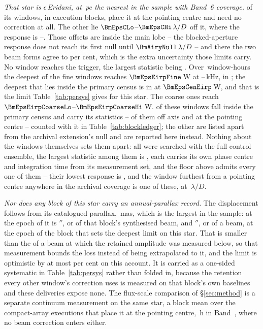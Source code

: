 \emph{That star is $\epsilon$\,Eridani, at \BmEpsDistPc\,pc the nearest in the
sample with Band~6 coverage.} \BmEpsNOn{} of its \BmEpsNWin{} windows, in
\BmEpsNBlock{} execution blocks, place it at the pointing centre and need no
correction at all. The other \BmEpsNOff{} lie
$\BmEpsCLo$--$\BmEpsCHi\,\lambda/D$ off it, where the response is
\BmEpsRespLo--\BmEpsRespHi. Those offsets are inside the main lobe -- the
blocked-aperture response does not reach its first null until
$\BmAiryNull\,\lambda/D$ -- and there the two beam forms agree to
\BmEpsAgreePct{} per cent, which is the extra uncertainty those limits carry.
No window reaches the trigger, the largest statistic being \BmEpsTMax. Over
\BmEpsHours\,window-hours the deepest of the \BmEpsNFine{} fine windows
reaches $\BmEpsEirpFine$\,W at
\BmEpsChanFineKHzLo--\BmEpsChanFineKHzHi\,kHz, in \BmEpsExtEb; the deepest
that lies inside the primary census is in \BmEpsCenEb{} at
$\BmEpsCenEirp$\,W, and that is the limit Table~\ref{tab:persys} gives for
this star. The
\BmEpsNCoarse{} coarse ones reach
$\BmEpsEirpCoarseLo$--$\BmEpsEirpCoarseHi$\,W. \BmEpsNCensus{} of these
windows fall inside the primary census and carry its statistics --
\BmEpsNCensusOff{} of them off axis and \BmEpsNCensusOn{} at the pointing
centre -- counted with it in Table~\ref{tab:blockledger}; the other
\BmEpsNExt{} are listed apart from the archival extension's null and are
reported here instead. Nothing about the windows themselves sets them apart:
all \ExNSearched{} were searched with the full control ensemble, the largest
statistic among them is \ExTMax, each carries its own phase centre and
integration time from its measurement set, and the floor above admits every
one of them -- their lowest response is \ExRespMin, and the window furthest
from a pointing centre anywhere in the archival coverage is one of these, at
\ExCWorstExt\,$\lambda/D$.

\emph{Nor does any block of this star carry an annual-parallax record.} The
displacement follows from its catalogued parallax, \BmEpsPlxMas\,mas, which
is the largest in the sample: at the epoch of \BmEpsCenEb{} it is
\ExCenPxArcsec$''$, or \ExCenPxBeams{} of that block's synthesised beam, and
\ExBestPxArcsec$''$, or \ExBestPxBeams{} of a beam, at the epoch of the block
that sets the deepest limit on this star.
That is smaller than the \SensPxSmallBeams{} of a beam at which the retained
amplitude was measured below, so that measurement bounds the loss instead of
being extrapolated to it, and the limit is optimistic by at most
\BmEpsPxBoundPct{} per cent on this account. It is carried as a one-sided
systematic in Table~\ref{tab:persys} rather than folded in, because the
retention every other window's correction uses is measured on that block's
own baselines and these deliveries expose none. The
flux-scale
comparison of \S\ref{sec:method} is a separate continuum measurement on the
same star, a block mean over the \PxEpsN{} compact-array executions that place
it at the pointing centre, \PxEpsHours\,h in Band~\PxEpsBand, where no beam
correction enters either.

